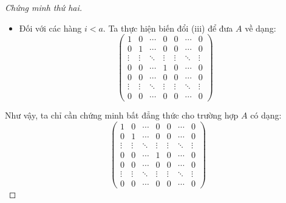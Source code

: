 \begin{proof}[Chứng minh thứ hai]
\begin{itemize}
\[\begin{pmatrix}
                      \vdots & \vdots & \ddots & \vdots & \vdots & \ddots & \vdots \\
                      0      & 0      & \cdots & 1      & 0      & \cdots & 0      \\
                      0      & 0      & \cdots & 0      & 0      & \cdots & 0      \\
                      \vdots & \vdots & \ddots & \vdots & \vdots & \ddots & \vdots \\
                      0      & 0      & \cdots & 0      & 0      & \cdots & 0
                  \end{pmatrix}
              \]
        \item Đối với các hàng $i < a$. Ta thực hiện biến đổi (iii) để đưa $A$ về dạng:
              \[
                  \begin{pmatrix}
                      1      & 0      & \cdots & 0      & 0      & \cdots & 0      \\
                      0      & 1      & \cdots & 0      & 0      & \cdots & 0      \\
                      \vdots & \vdots & \ddots & \vdots & \vdots & \ddots & \vdots \\
                      0      & 0      & \cdots & 1      & 0      & \cdots & 0      \\
                      0      & 0      & \cdots & 0      & 0      & \cdots & 0      \\
                      \vdots & \vdots & \ddots & \vdots & \vdots & \ddots & \vdots \\
                      0      & 0      & \cdots & 0      & 0      & \cdots & 0
                  \end{pmatrix}
              \]
    \end{itemize}
    
    Như vậy, ta chỉ cần chứng minh bất đẳng thức cho trường hợp $A$ có dạng:
    \[
        \begin{pmatrix}
            1      & 0      & \cdots & 0      & 0      & \cdots & 0      \\
            0      & 1      & \cdots & 0      & 0      & \cdots & 0      \\
            \vdots & \vdots & \ddots & \vdots & \vdots & \ddots & \vdots \\
            0      & 0      & \cdots & 1      & 0      & \cdots & 0      \\
            0      & 0      & \cdots & 0      & 0      & \cdots & 0      \\
            \vdots & \vdots & \ddots & \vdots & \vdots & \ddots & \vdots \\
            0      & 0      & \cdots & 0      & 0      & \cdots & 0
        \end{pmatrix}
    \]
    

\end{proof}
